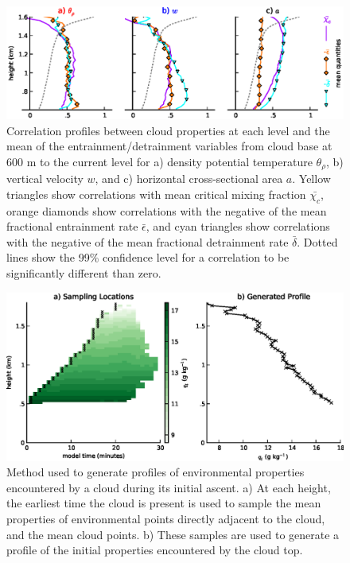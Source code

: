 \documentclass[acp]{copernicus}
\begin{document}
\begin{figure}[t]
\vspace*{2mm}
\begin{center}
\includegraphics[width=\textwidth]{./figures/cloud_base_integrals_env}
\end{center}
\caption{Correlation profiles between cloud properties at each level and the 
mean of the entrainment/detrainment variables from cloud base at 600 m to the 
current level for a) density potential temperature $\theta_\rho$, b) 
vertical velocity $w$, and c) horizontal cross-sectional area $a$.  Yellow 
triangles show correlations with mean critical mixing fraction $\bar{\chi_c}$, 
orange diamonds show correlations with the negative of the mean fractional 
entrainment rate $\bar{\epsilon}$, and cyan triangles show correlations with 
the negative of the mean fractional detrainment rate $\bar{\delta}$.  Dotted 
lines show the 99\% confidence level for a correlation to be significantly 
different than zero.}
\label{fig:cloud_base_integrals_env}
\end{figure}

\begin{figure}[t]
\vspace*{2mm}
\begin{center}
\includegraphics[width=\textwidth]{./figures/cloud_environment_schematic}
\end{center}
\caption{Method used to generate profiles of environmental properties 
encountered by a cloud during its initial ascent.  a) At each height, the 
earliest time the cloud is present is used to sample the mean properties of 
environmental points directly adjacent to the cloud, and the mean cloud points. 
b) These samples are used to generate a profile of the initial properties 
encountered by the cloud top.}
\label{fig:cloud_environment_schematic}
\end{figure}
\end{document}
